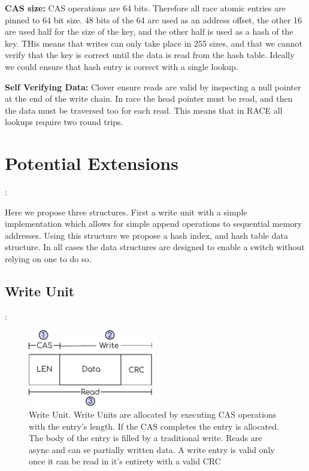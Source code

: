 \textbf{CAS size:} CAS operations are 64 bits. Therefore all race atomic entries
are pinned to 64 bit size. 48 bits of the 64 are used as an address offset, the
other 16 are used half for the size of the key, and the other half is used as a
hash of the key. THis means that writes can only take place in 255 sizes, and
that we cannot verify that the key is correct until the data is read from the
hash table. Ideally we could ensure that hash entry is correct with a single lookup.

\textbf{Self Verifying Data:} Clover ensure reads are valid by inspecting a null
pointer at the end of the write chain. In race the head pointer must be read,
and then the data must be traversed too for each read. This means that in RACE
all lookups require two round trips.

\section{Potential Extensions}:

Here we propose three structures. First a write unit with a simple
implementation which allows for simple append operations to sequential memory
addresses. Using this structure we propose a hash index, and hash table data
structure. In all cases the data structures are designed to enable a switch
without relying on one to do so.

\subsection{Write Unit}:

\begin{figure}[t] \includegraphics[width=0.485\textwidth]{fig/WriteBufEntry.pdf}
\caption{Write Unit. Write Units are allocated by executing CAS operations
with the entry's length. If the CAS completes the entry is allocated. The body
of the entry is filled by a traditional write. Reads are async and can se
partially written data. A write entry is valid only once it can be read in it's
entirety with a valid CRC}

\label{fig:write_unit}
\end{figure}

